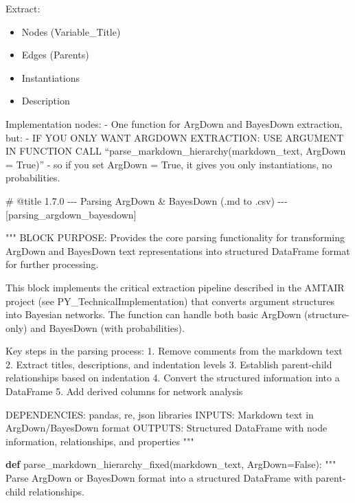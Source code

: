 \documentclass[
  11pt,
  letterpaper,
]{book}
\newenvironment{Shaded}{\begin{snugshade}}{\end{snugshade}}
\newcommand{\CommentTok}[1]{\textcolor[rgb]{0.37,0.37,0.37}{#1}}
\newcommand{\KeywordTok}[1]{\textcolor[rgb]{0.00,0.23,0.31}{\textbf{#1}}}
\newcommand{\NormalTok}[1]{\textcolor[rgb]{0.00,0.23,0.31}{#1}}
\newcommand{\OperatorTok}[1]{\textcolor[rgb]{0.37,0.37,0.37}{#1}}
\newcommand{\VariableTok}[1]{\textcolor[rgb]{0.07,0.07,0.07}{#1}}
\providecommand{\tightlist}{%
  \setlength{\itemsep}{0pt}\setlength{\parskip}{0pt}}
\begin{document}
Extract:

\begin{itemize}
\tightlist
\item
  Nodes (Variable\_Title)
\item
  Edges (Parents)
\item
  Instantiations
\item
  Description
\end{itemize}

Implementation nodes: - One function for ArgDown and BayesDown
extraction, but: - IF YOU ONLY WANT ARGDOWN EXTRACTION: USE ARGUMENT IN
FUNCTION CALL ``parse\_markdown\_hierarchy(markdown\_text, ArgDown =
True)'' - so if you set ArgDown = True, it gives you only
instantiations, no probabilities.

\label{parsing_argdown_bayesdown}
\begin{Shaded}
\begin{Highlighting}[]
\CommentTok{\# @title 1.7.0 {-}{-}{-} Parsing ArgDown \& BayesDown (.md to .csv) {-}{-}{-} [parsing\_argdown\_bayesdown]}

\CommentTok{"""}
\CommentTok{BLOCK PURPOSE: Provides the core parsing functionality for transforming ArgDown}
\CommentTok{and BayesDown text representations into structured DataFrame format for further}
\CommentTok{processing.}

\CommentTok{This block implements the critical extraction pipeline described in the AMTAIR}
\CommentTok{project (see PY\_TechnicalImplementation) that converts argument structures}
\CommentTok{into Bayesian networks.}
\CommentTok{The function can handle both basic ArgDown (structure{-}only) and}
\CommentTok{BayesDown (with probabilities).}

\CommentTok{Key steps in the parsing process:}
\CommentTok{1. Remove comments from the markdown text}
\CommentTok{2. Extract titles, descriptions, and indentation levels}
\CommentTok{3. Establish parent{-}child relationships based on indentation}
\CommentTok{4. Convert the structured information into a DataFrame}
\CommentTok{5. Add derived columns for network analysis}

\CommentTok{DEPENDENCIES: pandas, re, json libraries}
\CommentTok{INPUTS: Markdown text in ArgDown/BayesDown format}
\CommentTok{OUTPUTS: Structured DataFrame with node information, relationships, and properties}
\CommentTok{"""}

\KeywordTok{def}\NormalTok{ parse\_markdown\_hierarchy\_fixed(markdown\_text, ArgDown}\OperatorTok{=}\VariableTok{False}\NormalTok{):}
    \CommentTok{"""}
\CommentTok{    Parse ArgDown or BayesDown format into a structured DataFrame with parent{-}child relationships.}


\end{Highlighting}
\end{Shaded}
\end{document}
